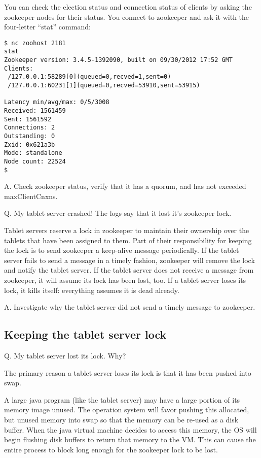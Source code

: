 You can check the election status and connection status of clients by
asking the zookeeper nodes for their status.  You connect to zookeeper
and ask it with the four-letter ``stat'' command:

\small
\begin{verbatim}
$ nc zoohost 2181
stat
Zookeeper version: 3.4.5-1392090, built on 09/30/2012 17:52 GMT
Clients:
 /127.0.0.1:58289[0](queued=0,recved=1,sent=0)
 /127.0.0.1:60231[1](queued=0,recved=53910,sent=53915)

Latency min/avg/max: 0/5/3008
Received: 1561459
Sent: 1561592
Connections: 2
Outstanding: 0
Zxid: 0x621a3b
Mode: standalone
Node count: 22524
$
\end{verbatim}
\normalsize


A. Check zookeeper status, verify that it has a quorum, and has not exceeded maxClientCnxns.

Q. My tablet server crashed!  The logs say that it lost it's zookeeper lock.

Tablet servers reserve a lock in zookeeper to maintain their ownership
over the tablets that have been assigned to them.  Part of their
responsibility for keeping the lock is to send zookeeper a keep-alive
message periodically.  If the tablet server fails to send a message in
a timely fashion, zookeeper will remove the lock and notify the tablet
server.  If the tablet server does not receive a message from
zookeeper, it will assume its lock has been lost, too.  If a tablet
server loses its lock, it kills itself: everything assumes it is dead
already.

A. Investigate why the tablet server did not send a timely message to
zookeeper.

\subsection{Keeping the tablet server lock}

Q. My tablet server lost its lock.  Why?

The primary reason a tablet server loses its lock is that it has been pushed into swap.

A large java program (like the tablet server) may have a large portion
of its memory image unused.  The operation system will favor pushing
this allocated, but unused memory into swap so that the memory can be
re-used as a disk buffer.  When the java virtual machine decides to
access this memory, the OS will begin flushing disk buffers to return that
memory to the VM.  This can cause the entire process to block long
enough for the zookeeper lock to be lost.

